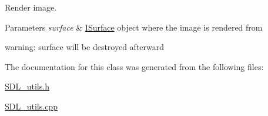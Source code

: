 Render image. 


\begin{DoxyParams}{Parameters}
{\em surface} & \mbox{\hyperlink{class_i_surface}{I\+Surface}} object where the image is rendered from\\
\hline
\end{DoxyParams}
warning\+: surface will be destroyed afterward 

The documentation for this class was generated from the following files\+:\begin{DoxyCompactItemize}
\item 
\mbox{\hyperlink{_s_d_l__utils_8h}{S\+D\+L\+\_\+utils.\+h}}\item 
\mbox{\hyperlink{_s_d_l__utils_8cpp}{S\+D\+L\+\_\+utils.\+cpp}}\end{DoxyCompactItemize}

